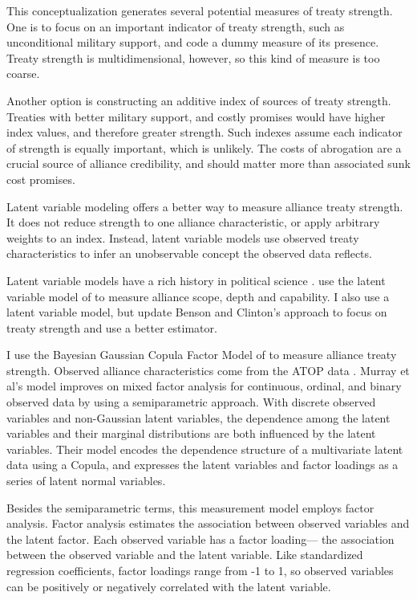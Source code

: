 \documentclass[12pt]{article}
\begin{document}
This conceptualization generates several potential measures of treaty strength. 
One is to focus on an important indicator of treaty strength, such as unconditional military support, and code a dummy measure of its presence. 
Treaty strength is multidimensional, however, so this kind of measure is too coarse. 


Another option is constructing an additive index of sources of treaty strength. 
Treaties with better military support, and costly promises would have higher index values, and therefore greater strength. 
Such indexes assume each indicator of strength is equally important, which is unlikely. 
The costs of abrogation are a crucial source of alliance credibility, and should matter more than associated sunk cost promises. 


Latent variable modeling offers a better way to measure alliance treaty strength. 
It does not reduce strength to one alliance characteristic, or apply arbitrary weights to an index. 
Instead, latent variable models use observed treaty characteristics to infer an unobservable concept the observed data reflects. 


Latent variable models have a rich history in political science \citep{Clintonetal2004, TreierJackman2008, Fariss2014}. 
\citet{BensonClinton2016} use the latent variable model of \citet{Quinn2004} to measure alliance scope, depth and capability.
I also use a latent variable model, but update Benson and Clinton's approach to focus on treaty strength and use a better estimator. 


I use the Bayesian Gaussian Copula Factor Model of \citet{Murrayetal2013} to measure alliance treaty strength. 
Observed alliance characteristics come from the ATOP data \citep{Leedsetal2002}.
Murray et al's model improves on mixed factor analysis for continuous, ordinal, and binary observed data by using a semiparametric approach. 
With discrete observed variables and non-Gaussian latent variables, the dependence among the latent variables and their marginal distributions are both influenced by the latent variables.
Their model encodes the dependence structure of a multivariate latent data using a Copula, and expresses the latent variables and factor loadings as a series of latent normal variables. 


Besides the semiparametric terms, this measurement model employs factor analysis.
Factor analysis estimates the association between observed variables and the latent factor.
Each observed variable has a factor loading--- the association between the observed variable and the latent variable.  
Like standardized regression coefficients, factor loadings range from -1 to 1, so observed variables can be positively or negatively correlated with the latent variable.  
\end{document}
